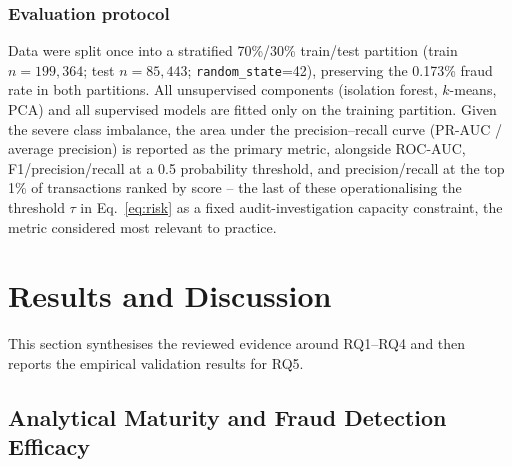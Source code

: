 \documentclass[preprint,12pt]{elsarticle}
\begin{document}
\subsubsection{Evaluation protocol}

Data were split once into a stratified 70\%/30\% train/test partition (train $n=199{,}364$; test $n=85{,}443$; \texttt{random\_state}=42), preserving the 0.173\% fraud rate in both partitions. All unsupervised components (isolation forest, $k$-means, PCA) and all supervised models are fitted only on the training partition. Given the severe class imbalance, the area under the precision--recall curve (PR-AUC / average precision) is reported as the primary metric, alongside ROC-AUC, F1/precision/recall at a 0.5 probability threshold, and precision/recall at the top 1\% of transactions ranked by score -- the last of these operationalising the threshold $\tau$ in Eq.~\eqref{eq:risk} as a fixed audit-investigation capacity constraint, the metric considered most relevant to practice.

\section{Results and Discussion}
\label{sec:results}

This section synthesises the reviewed evidence around RQ1--RQ4 and then reports the empirical validation results for RQ5.

\subsection{Analytical Maturity and Fraud Detection Efficacy}
\label{sec:maturity}
\end{document}
